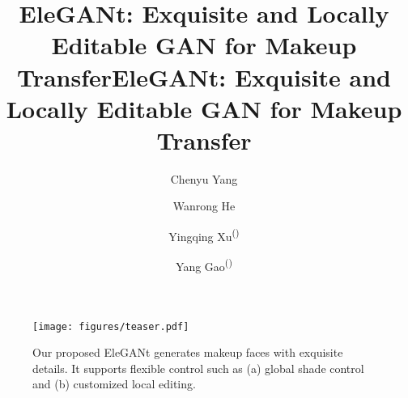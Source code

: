 \title{EleGANt: Exquisite and Locally Editable GAN for Makeup Transfer}



\pagestyle{headings}
\mainmatter
\def\ECCVSubNumber{5430}  %

\title{EleGANt: Exquisite and Locally Editable GAN for Makeup Transfer} %

\begin{comment}
\titlerunning{ECCV-22 submission ID \ECCVSubNumber} 
\authorrunning{ECCV-22 submission ID \ECCVSubNumber} 
\author{Anonymous ECCV submission}
\institute{Paper ID \ECCVSubNumber}
\end{comment}

\author{Chenyu Yang\and
Wanrong He\and
Yingqing Xu\textsuperscript{(\textrm{\Letter})}\and
Yang Gao\textsuperscript{(\textrm{\Letter})}
}

\maketitle
\let\thefootnote\relax{}

\begin{figure}[!htbp]
\vskip -0.2cm
\setlength{\abovecaptionskip}{-0.1cm}
\setlength{\belowcaptionskip}{-0.6cm} 
\centering
\texttt{[image: figures/teaser.pdf]}
\caption{Our proposed EleGANt generates makeup faces with exquisite details. It supports flexible control such as (a) global shade control and (b) customized local editing.}
\label{fig-teaser}
\end{figure}

